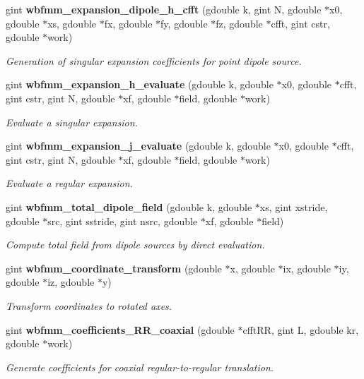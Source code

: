 \begin{DoxyCompactItemize}
gint \textbf{ wbfmm\+\_\+expansion\+\_\+dipole\+\_\+h\+\_\+cfft} (gdouble k, gint N, gdouble $\ast$x0, gdouble $\ast$xs, gdouble $\ast$fx, gdouble $\ast$fy, gdouble $\ast$fz, gdouble $\ast$cfft, gint cstr, gdouble $\ast$work)
\begin{DoxyCompactList}\small\item\em Generation of singular expansion coefficients for point dipole source. \end{DoxyCompactList}\item 
gint \textbf{ wbfmm\+\_\+expansion\+\_\+h\+\_\+evaluate} (gdouble k, gdouble $\ast$x0, gdouble $\ast$cfft, gint cstr, gint N, gdouble $\ast$xf, gdouble $\ast$field, gdouble $\ast$work)
\begin{DoxyCompactList}\small\item\em Evaluate a singular expansion. \end{DoxyCompactList}\item 
gint \textbf{ wbfmm\+\_\+expansion\+\_\+j\+\_\+evaluate} (gdouble k, gdouble $\ast$x0, gdouble $\ast$cfft, gint cstr, gint N, gdouble $\ast$xf, gdouble $\ast$field, gdouble $\ast$work)
\begin{DoxyCompactList}\small\item\em Evaluate a regular expansion. \end{DoxyCompactList}\item 
gint \textbf{ wbfmm\+\_\+total\+\_\+dipole\+\_\+field} (gdouble k, gdouble $\ast$xs, gint xstride, gdouble $\ast$src, gint sstride, gint nsrc, gdouble $\ast$xf, gdouble $\ast$field)
\begin{DoxyCompactList}\small\item\em Compute total field from dipole sources by direct evaluation. \end{DoxyCompactList}\item 
gint \textbf{ wbfmm\+\_\+coordinate\+\_\+transform} (gdouble $\ast$x, gdouble $\ast$ix, gdouble $\ast$iy, gdouble $\ast$iz, gdouble $\ast$y)
\begin{DoxyCompactList}\small\item\em Transform coordinates to rotated axes. \end{DoxyCompactList}\item 
gint \textbf{ wbfmm\+\_\+coefficients\+\_\+\+R\+R\+\_\+coaxial} (gdouble $\ast$cfft\+RR, gint L, gdouble kr, gdouble $\ast$work)
\begin{DoxyCompactList}\small\item\em Generate coefficients for coaxial regular-\/to-\/regular translation. \end{DoxyCompactList}\item 

\end{DoxyCompactItemize}
